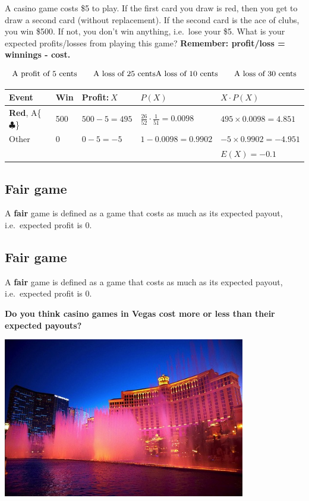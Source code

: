 \documentclass[
]{article}
\begin{document}
A casino game costs \$5 to play. If the first card you draw is red, then
you get to draw a second card (without replacement). If the second card
is the ace of clubs, you win \$500. If not, you don't win anything,
i.e.~lose your \$5. What is your expected profits/losses from playing
this game? \textbf{{Remember: profit/loss = winnings - cost.}}

\[
\text{A profit of 5 cents}\qquad \text{A loss of 25 cents}\\
\text{A loss of 10 cents} \qquad \text{A loss of 30 cents}
\]

\begin{longtable}[]{@{}lllll@{}}
\toprule
Event & Win & Profit:\(~X\) & \(P(X)\) & \(X\cdot P(X)\)\tabularnewline
\midrule
\endhead
\textbf{Red}, A\{\(\clubsuit\)\} & 500 & \(500 - 5 = 495\) &
\(\frac{26}{52} \cdot\frac{1}{51} = 0.0098\) &
\(495 \times 0.0098 = 4.851\)\tabularnewline
Other & 0 & \(0 - 5 = -5\) & \(1 - 0.0098 = 0.9902\) &
\(-5 \times 0.9902 = -4.951\)\tabularnewline
& & & & \(E(X) = -0.1\)\tabularnewline
\bottomrule
\end{longtable}

\hypertarget{fair-game}{%
\subsection{Fair game}\label{fair-game}}

A \textbf{fair} game is defined as a game that costs as much as its
expected payout, i.e.~expected profit is 0.

\hypertarget{fair-game-1}{%
\subsection{Fair game}\label{fair-game-1}}

A \textbf{fair} game is defined as a game that costs as much as its
expected payout, i.e.~expected profit is 0.

\textbf{Do you think casino games in Vegas cost more or less than their
expected payouts?}

\includegraphics[width=400px]{fig/bellagio}
\end{document}
